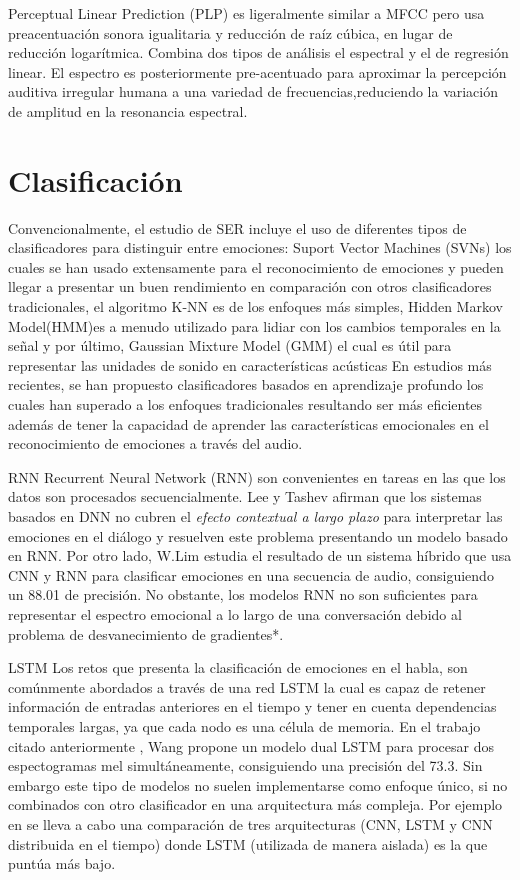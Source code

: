 \documentclass[11pt,a4paper,spanish]{book}
\begin{document}
		Perceptual Linear Prediction (PLP) es ligeralmente similar a MFCC pero usa preacentuación sonora igualitaria y reducción de raíz cúbica, en lugar de reducción logarítmica. Combina dos tipos de análisis el espectral y el de regresión linear. El espectro es posteriormente pre-acentuado para aproximar la percepción auditiva irregular humana a una variedad de frecuencias,reduciendo la variación de amplitud en la resonancia espectral.
		
		
		\section{Clasificación}
		Convencionalmente, el estudio de SER incluye el uso de diferentes tipos de clasificadores para distinguir entre emociones: Suport Vector Machines (SVNs) los cuales se han usado extensamente para el reconocimiento de emociones y pueden llegar a presentar un buen rendimiento en comparación con otros clasificadores tradicionales, el algoritmo K-NN es de los enfoques más simples, Hidden Markov Model(HMM)es a menudo utilizado para lidiar con los cambios temporales en la señal y por último, Gaussian Mixture Model (GMM) el cual es útil para representar las unidades de sonido en características acústicas %
		En estudios más recientes, se han propuesto clasificadores basados en aprendizaje profundo los cuales han superado a los enfoques tradicionales resultando ser más eficientes además de tener la capacidad de aprender las características emocionales en el reconocimiento de emociones a través del audio.
		
		
		RNN 
		Recurrent Neural Network (RNN) son convenientes en tareas en las que los datos son procesados secuencialmente.
		Lee y Tashev \cite{Lee2015} afirman que los sistemas basados en DNN no cubren el \emph{efecto contextual a largo plazo} para interpretar las emociones en el diálogo y resuelven este problema presentando un modelo basado en RNN. Por otro lado, W.Lim \cite{Lim2017} estudia el resultado de un sistema híbrido que usa CNN y RNN para clasificar emociones en una secuencia de audio, consiguiendo un 88.01 de precisión.
		No obstante, los modelos RNN no son suficientes para representar el espectro emocional a lo largo de una conversación debido al problema de desvanecimiento de gradientes*.
		
		LSTM
		Los retos que presenta la clasificación de emociones en el habla, son comúnmente abordados a través de una red LSTM la cual es capaz de retener información de entradas anteriores en el tiempo y tener en cuenta dependencias temporales largas, ya que cada nodo es una célula de memoria.
		En el trabajo citado anteriormente \cite{Wang2020}, Wang propone un modelo dual LSTM para procesar dos espectogramas mel simultáneamente, consiguiendo una precisión del 73.3. 
		Sin embargo este tipo de modelos no suelen implementarse como enfoque único, si no combinados con otro clasificador en una arquitectura más compleja. Por ejemplo en \cite{Lim2017} se lleva a cabo una comparación de tres  arquitecturas (CNN, LSTM y CNN distribuida en el tiempo) donde LSTM (utilizada de manera aislada) es la que puntúa más bajo.	
		
\end{document}
